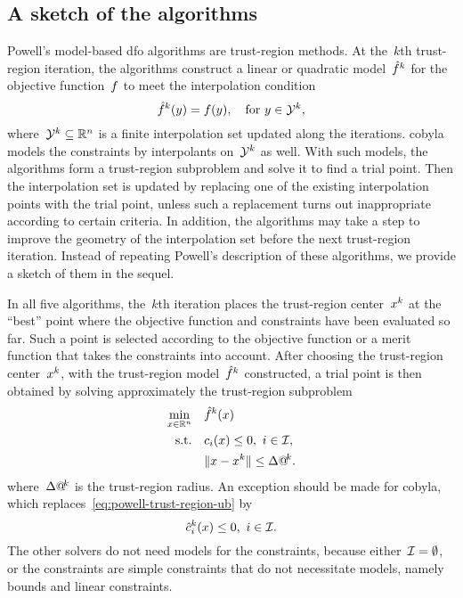 \subsection{A sketch of the algorithms}

Powell's model-based \gls{dfo} algorithms are trust-region methods.
At the~$k$th trust-region iteration, the algorithms construct a linear or quadratic model~$\objm[k]$ for the objective function~$f$ to meet the interpolation condition
\begin{equation}
    \label{eq:itpls}
    \objm[k](y) = \obj(y), \quad \text{for~$y \in \xpt[k]$,}
\end{equation}
where~$\xpt[k] \subseteq \R^n$ is a finite interpolation set updated along the iterations.
\Gls{cobyla} models the constraints by interpolants on~$\xpt[k]$ as well.
With such models, the algorithms form a trust-region subproblem and solve it to find a trial point.
Then the interpolation set is updated by replacing one of the existing interpolation points with the trial point, unless such a replacement turns out inappropriate according to certain criteria.
In addition, the algorithms may take a step to improve the geometry of the interpolation set before the next trust-region iteration.
Instead of repeating Powell's description of these algorithms, we provide a sketch of them in the sequel.

In all five algorithms, the~$k$th iteration places the trust-region center~$\iter[k]$ at the \enquote{best} point where the objective function and constraints have been evaluated so far.
Such a point is selected according to the objective function or a merit function that takes the constraints into account.
After choosing the trust-region center~$\iter[k]$, with the trust-region model~$\objm[k]$ constructed, a trial point is then obtained by solving approximately the trust-region subproblem
\begin{subequations}
    \label{eq:powell-trust-region}
    \begin{align}
        \min_{\iter \in \R^n}   & \quad \objm[k](\iter)\\
        \text{s.t.}             & \quad \con{i}(\iter) \le 0, ~ i \in \iub, \label{eq:powell-trust-region-ub}\\
                                & \quad \norm{\iter - \iter[k]} \le \rad[k].
    \end{align}
\end{subequations}
where~$\rad[k]$ is the trust-region radius.
An exception should be made for \gls{cobyla}, which replaces~\cref{eq:powell-trust-region-ub} by
\begin{equation*}
    \conm[k]{i}(\iter) \le 0, ~ i \in \iub.
\end{equation*}
The other solvers do not need models for the constraints, because either~$\mathcal{I} = \emptyset$, or the constraints are simple constraints that do not necessitate models, namely bounds and linear constraints.

